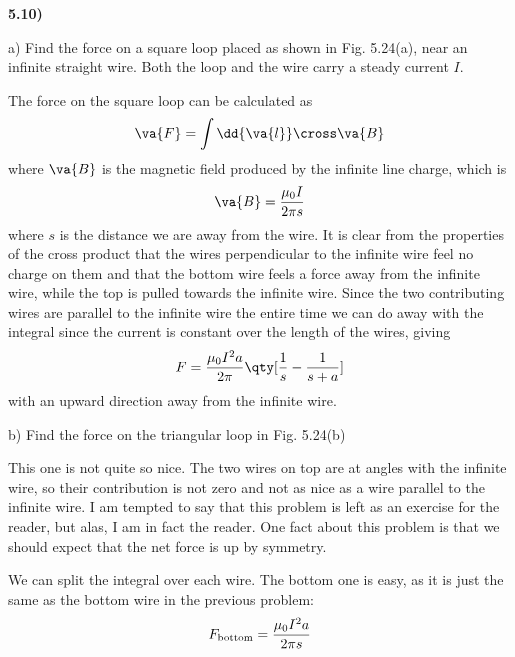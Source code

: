\documentclass[12pt,a4paper]{article}
\newcommand{\prob}[2]{\textbf{#1)} #2}
\begin{document}
\prob{5.10}{}

a) Find the force on a square loop placed as shown in Fig. 5.24(a), near an infinite straight wire. Both the loop and the wire carry a steady current $I$.

The force on the square loop can be calculated as
\begin{align*}
\va{F} = \int \dd{\va{l}} \cross \va{B}
\end{align*}
where $\va{B}$ is the magnetic field produced by the infinite line charge, which is 
\begin{align*}
\va{B} = \frac{\mu_0 I}{2 \pi s}
\end{align*}
where $s$ is the distance we are away from the wire.
It is clear from the properties of the cross product that the wires perpendicular to the infinite wire feel no charge on them and that the bottom wire feels a force away from the infinite wire, while the top is pulled towards the infinite wire.
Since the two contributing wires are parallel to the infinite wire the entire time we can do away with the integral since the current is constant over the length of the wires, giving
\begin{align*}
F = \frac{\mu_0 I^2 a}{2 \pi}\qty[ \frac{1}{s} - \frac{1}{s+a} ]
\end{align*}
with an upward direction away from the infinite wire.

b) Find the force on the triangular loop in Fig. 5.24(b)

This one is not quite so nice. 
The two wires on top are at angles with the infinite wire, so their contribution is not zero and not as nice as a wire parallel to the infinite wire.
I am tempted to say that this problem is left as an exercise for the reader, but alas, I am in fact the reader.
One fact about this problem is that we should expect that the net force is up by symmetry.

We can split the integral over each wire.
The bottom one is easy, as it is just the same as the bottom wire in the previous problem:
\begin{align*}
F_{\rm bottom} = \frac{\mu_0 I^2 a}{2 \pi s}
\end{align*}
\end{document}

